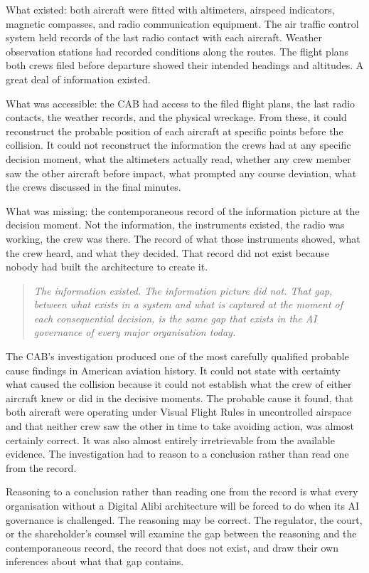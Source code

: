 What existed: both aircraft were fitted with altimeters, airspeed indicators, magnetic compasses, and radio communication equipment. The air traffic control system held records of the last radio contact with each aircraft. Weather observation stations had recorded conditions along the routes. The flight plans both crews filed before departure showed their intended headings and altitudes. A great deal of information existed.

What was accessible: the CAB had access to the filed flight plans, the last radio contacts, the weather records, and the physical wreckage. From these, it could reconstruct the probable position of each aircraft at specific points before the collision. It could not reconstruct the information the crews had at any specific decision moment, what the altimeters actually read, whether any crew member saw the other aircraft before impact, what prompted any course deviation, what the crews discussed in the final minutes.

What was missing: the contemporaneous record of the information picture at the decision moment. Not the information, the instruments existed, the radio was working, the crew was there. The record of what those instruments showed, what the crew heard, and what they decided. That record did not exist because nobody had built the architecture to create it.

\begin{quote}
\emph{The information existed. The information picture did not. That gap, between what exists in a system and what is captured at the moment of each consequential decision, is the same gap that exists in the AI governance of every major organisation today.}
\end{quote}

The CAB's investigation produced one of the most carefully qualified probable cause findings in American aviation history. It could not state with certainty what caused the collision because it could not establish what the crew of either aircraft knew or did in the decisive moments. The probable cause it found, that both aircraft were operating under Visual Flight Rules in uncontrolled airspace and that neither crew saw the other in time to take avoiding action, was almost certainly correct. It was also almost entirely irretrievable from the available evidence. The investigation had to reason to a conclusion rather than read one from the record.

Reasoning to a conclusion rather than reading one from the record is what every organisation without a Digital Alibi architecture will be forced to do when its AI governance is challenged. The reasoning may be correct. The regulator, the court, or the shareholder's counsel will examine the gap between the reasoning and the contemporaneous record, the record that does not exist, and draw their own inferences about what that gap contains.

